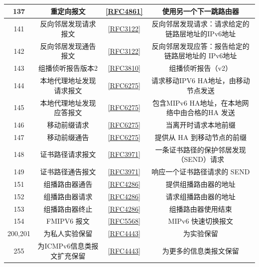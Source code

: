 \begin{table}[]
\begin{tabular}{c|c|c|c}
		137	&	重定向报文	&	\href{https://www.rfc-editor.org/rfc/rfc4861}{[RFC4861]}	&	使用另一个下一跳路由器 \\ \hline
		141	&	反向邻居发现请求报文	&	\href{https://www.rfc-editor.org/rfc/rfc3122}{[RFC3122]}	&	反向邻居发现请求：请求给定的链路层地址的IPv6地址 \\ \hline
		142	&	反向邻居发现通告报文	&	\href{https://www.rfc-editor.org/rfc/rfc3122}{[RFC3122]}	&	反向邻居发现应答：报告给定的链路层地址的 IPv6地址 \\ \hline
		143	&	组播侦听报告版本2	&	\href{https://www.rfc-editor.org/rfc/rfc3810}{[RFC3810]}	&	组播侦听报告（v2） \\ \hline
		144	&	本地代理地址发现请求报文	&	\href{https://www.rfc-editor.org/rfc/rfc6275}{[RFC6275]}	&	请求移动IPV6 HA地址，由移动节点发送 \\ \hline
		145	&	本地代理地址发现应答报文	&	\href{https://www.rfc-editor.org/rfc/rfc6275}{[RFC6275]}	&	包含MIPv6 HA地址，在本地网络中由合格的HA 发送 \\ \hline
		146	&	移动前缀请求	&	\href{https://www.rfc-editor.org/rfc/rfc6275}{[RFC6275]}	&	当离开时请求本地前缀 \\ \hline
		147	&	移动前缀通告	&	\href{https://www.rfc-editor.org/rfc/rfc6275}{[RFC6275]}	&	提供从 HA 到移动节点的前缀 \\ \hline
		148	&	证书路径请求报文	&	\href{https://www.rfc-editor.org/rfc/rfc3971}{[RFC3971]}	&	一条证书路径的保护邻居发现（SEND）请求 \\ \hline
		149	&	证书路径通告报文	&	\href{https://www.rfc-editor.org/rfc/rfc3971}{[RFC3971]}	&	响应一个证书路径请求的 SEND \\ \hline
		151	&	组播路由器通告	&	\href{https://www.rfc-editor.org/rfc/rfc4286}{[RFC4286]}	&	提供组播路由器的地址 \\ \hline
		152	&	组播路由器请求	&	\href{https://www.rfc-editor.org/rfc/rfc4286}{[RFC4286]}	&	请求组播路由器的地址 \\ \hline
		153	&	组播路由器终止	&	\href{https://www.rfc-editor.org/rfc/rfc4286}{[RFC4286]}	&	组播路由器使用结束 \\ \hline
		154	&	FMIPV6 报文	&	\href{https://www.rfc-editor.org/rfc/rfc5568}{[RFC5568]}	&	MIPv6 快速切换报文 \\ \hline
		200,201	&	为私人实验保留	&	\href{https://www.rfc-editor.org/rfc/rfc4443}{[RFC4443]}	&	为实验保留 \\ \hline
		255	&	为ICMPv6信息类报文扩充保留	&	\href{https://www.rfc-editor.org/rfc/rfc4443}{[RFC4443]}	&	为更多的信息类报文保留 \\ \hline
    \end{tabular}
\end{table}

